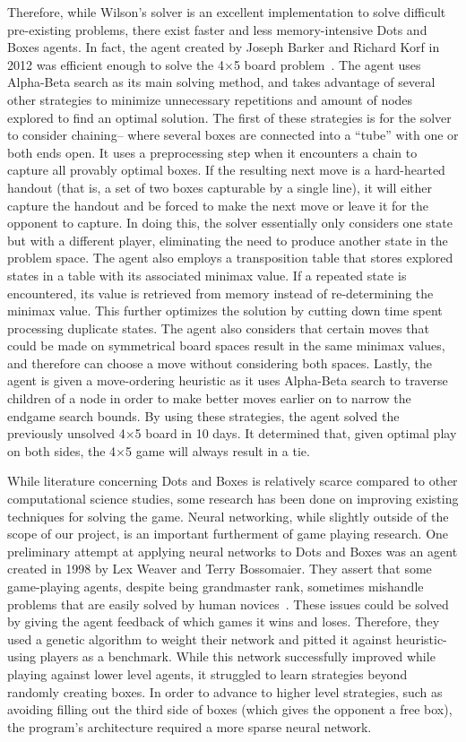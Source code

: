 \documentclass[12pt]{article}
\begin{document}
    Therefore, while Wilson’s solver is an excellent implementation to solve difficult pre-existing problems, there exist faster and less memory-intensive Dots and Boxes agents. In fact, the agent created by Joseph Barker and Richard Korf in 2012 was efficient enough to solve the 4$\times$5 board problem~\cite{Barker_Korf_2012}. The agent uses Alpha-Beta search as its main solving method, and takes advantage of several other strategies to minimize unnecessary repetitions and amount of nodes explored to find an optimal solution. The first of these strategies is for the solver to consider chaining-- where several boxes are connected into a ``tube'' with one or both ends open. It uses a preprocessing step when it encounters a chain to capture all provably optimal boxes. If the resulting next move is a hard-hearted handout (that is, a set of two boxes capturable by a single line), it will either capture the handout and be forced to make the next move or leave it for the opponent to capture. In doing this, the solver essentially only considers one state but with a different player, eliminating the need to produce another state in the problem space. The agent also employs a transposition table that stores explored states in a table with its associated minimax value. If a repeated state is encountered, its value is retrieved from memory instead of re-determining the minimax value. This further optimizes the solution by cutting down time spent processing duplicate states. The agent also considers that certain moves that could be made on symmetrical board spaces result in the same minimax values, and therefore can choose a move without considering both spaces. Lastly, the agent is given a move-ordering heuristic as it uses Alpha-Beta search to traverse children of a node in order to make better moves earlier on to narrow the endgame search bounds. By using these strategies, the agent solved the previously unsolved 4$\times$5 board in 10 days. It determined that, given optimal play on both sides, the 4$\times$5 game will always result in a tie. 
    
    While literature concerning Dots and Boxes is relatively scarce compared to other computational science studies, some research has been done on improving existing techniques for solving the game. Neural networking, while slightly outside of the scope of our project, is an important furtherment of game playing research. One preliminary attempt at applying neural networks to Dots and Boxes was an agent created in 1998 by Lex Weaver and Terry Bossomaier. They assert that some game-playing agents, despite being grandmaster rank, sometimes mishandle problems that are easily solved by human novices~\cite{Cornell1998}. These issues could be solved by giving the agent feedback of which games it wins and loses. Therefore, they used a genetic algorithm to weight their network and pitted it against heuristic-using players as a benchmark. While this network successfully improved while playing against lower level agents, it struggled to learn strategies beyond randomly creating boxes. In order to advance to higher level strategies, such as avoiding filling out the third side of boxes (which gives the opponent a free box), the program’s architecture required a more sparse neural network.
    
\end{document}
